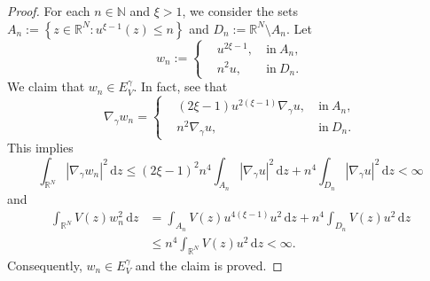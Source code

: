 \documentclass[10pt,a4paper]{amsart}
\newcommand{\R}{\mathbb{R}}
\begin{document}
\begin{proof}
	For each $n \in \mathbb{N}$ and $\xi>1$, we consider the sets $A_n:=\left\lbrace z \in \mathbb{R}^N : u^{\xi-1}(z) \leq n\right\rbrace $ and $D_n:= \mathbb{R}^N \setminus A_n$. 
Let
	$$
	w_n:=\left\{
	\begin{aligned}
		& u^{2\xi-1} ,\ &\mbox{in} \ A_n, \\
		&n^2u, \ &\mbox{in} \ D_n.
	\end{aligned}
	\right.
	$$
We claim that \(w_n \in E_V^\gamma\). In fact, see that
	$$
	\nabla_{\gamma}w_n=\left\{
	\begin{aligned}
		& (2\xi-1)u^{2(\xi-1)}\nabla_{\gamma}u ,\ &\mbox{in} \ A_n, \\
		&n^2\nabla_{\gamma}u, \ &\mbox{in} \ D_n.
	\end{aligned}
	\right.
	$$
    This implies
	$$
	\int_{\R^N}|\nabla_{\gamma} w_n|^2\,\mathrm{d}z \leq (2\xi-1)^2n^4\int_{A_n}|\nabla_\gamma u|^2\,\mathrm{d}z + n^4\int_{D_n}|\nabla_\gamma u|^2\,\mathrm{d}z<\infty
	$$
	and
\[
\begin{aligned}
    \int_{\R^N}V(z)w_n^2\,\mathrm{d}z &= \int_{A_n}V(z)u^{4(\xi-1)}u^2\,\mathrm{d}z + n^4\int_{D_n}V(z)u^2\,\mathrm{d}z 
    \\
    &\leq n^4\int_{\R^N}V(z)u^2\,\mathrm{d}z<\infty.
\end{aligned}
\]
Consequently, $w_n \in E_V^\gamma$ and the claim is proved.


\end{proof}
\end{document}
